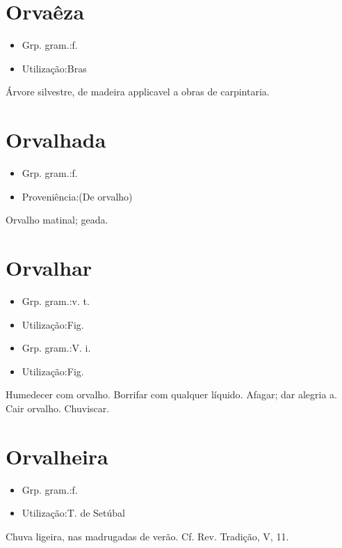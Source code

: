 \section{Orvaêza}
\begin{itemize}
\item {Grp. gram.:f.}
\end{itemize}
\begin{itemize}
\item {Utilização:Bras}
\end{itemize}
Árvore silvestre, de madeira applicavel a obras de carpintaria.
\section{Orvalhada}
\begin{itemize}
\item {Grp. gram.:f.}
\end{itemize}
\begin{itemize}
\item {Proveniência:(De \textunderscore orvalho\textunderscore )}
\end{itemize}
Orvalho matinal; geada.
\section{Orvalhar}
\begin{itemize}
\item {Grp. gram.:v. t.}
\end{itemize}
\begin{itemize}
\item {Utilização:Fig.}
\end{itemize}
\begin{itemize}
\item {Grp. gram.:V. i.}
\end{itemize}
\begin{itemize}
\item {Utilização:Fig.}
\end{itemize}
Humedecer com orvalho.
Borrifar com qualquer líquido.
Afagar; dar alegria a.
Cair orvalho.
Chuviscar.
\section{Orvalheira}
\begin{itemize}
\item {Grp. gram.:f.}
\end{itemize}
\begin{itemize}
\item {Utilização:T. de Setúbal}
\end{itemize}
Chuva ligeira, nas madrugadas de verão. Cf. Rev. \textunderscore Tradição\textunderscore , V, 11.
